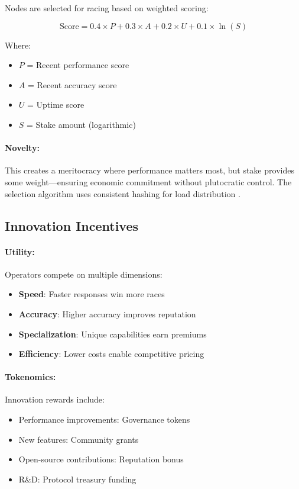 \documentclass[12pt,a4paper]{article}
\begin{document}
Nodes are selected for racing based on weighted scoring:

\begin{equation}
\text{Score} = 0.4 \times P + 0.3 \times A + 0.2 \times U + 0.1 \times \ln(S)
\end{equation}

Where:
\begin{itemize}
    \item $P$ = Recent performance score
    \item $A$ = Recent accuracy score
    \item $U$ = Uptime score
    \item $S$ = Stake amount (logarithmic)
\end{itemize}

\paragraph{Novelty:} This creates a meritocracy where performance matters most, but stake provides some weight—ensuring economic commitment without plutocratic control. The selection algorithm uses consistent hashing for load distribution \cite{consistenthashing1997}.

\subsection{Innovation Incentives}

\paragraph{Utility:} Operators compete on multiple dimensions:
\begin{itemize}
    \item \textbf{Speed}: Faster responses win more races
    \item \textbf{Accuracy}: Higher accuracy improves reputation
    \item \textbf{Specialization}: Unique capabilities earn premiums
    \item \textbf{Efficiency}: Lower costs enable competitive pricing
\end{itemize}

\paragraph{Tokenomics:} Innovation rewards include:
\begin{itemize}
    \item Performance improvements: Governance tokens
    \item New features: Community grants
    \item Open-source contributions: Reputation bonus
    \item R\&D: Protocol treasury funding
\end{itemize}
\end{document}
